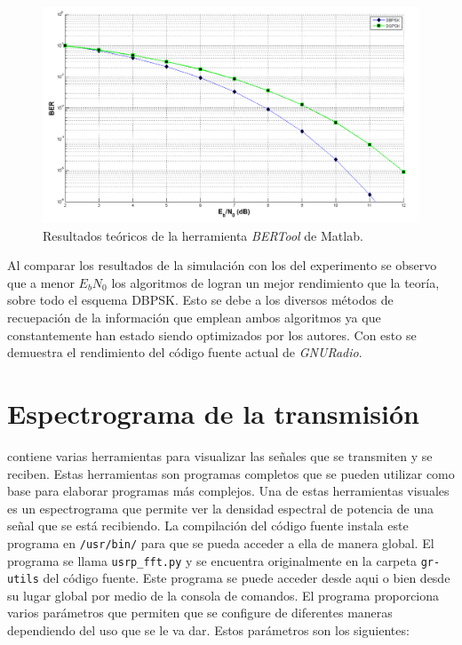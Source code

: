 \begin{figure}[htp]
  \centering
  \includegraphics[scale=0.455]{figs/berteor}
  \caption{Resultados te\'oricos de la herramienta \emph{BERTool} de Matlab.}
  \label{fig:berteor}
\end{figure}

Al comparar los resultados de la simulaci\'on con los del experimento se observo que a menor $E_bN_0$ los algoritmos de \gnuradio
logran un mejor rendimiento que la teor\'ia, sobre todo el esquema DBPSK. Esto se debe a los diversos m\'etodos de recuepaci\'on
de la informaci\'on que emplean ambos algoritmos ya que constantemente han estado siendo optimizados por los autores. Con esto se
demuestra el rendimiento del c\'odigo fuente actual de \emph{GNURadio}.


\section{Espectrograma de la transmisi\'on}

\gnuradio contiene varias herramientas para visualizar las se\~nales que se transmiten y se reciben.
Estas herramientas son programas completos que se pueden utilizar como base para elaborar programas
m\'as complejos. Una de estas herramientas visuales es un espectrograma que permite ver la densidad
espectral de potencia de una se\~nal que se est\'a recibiendo. La compilaci\'on del c\'odigo fuente
instala este programa en \verb|/usr/bin/| para que se pueda acceder a ella de manera global. El
programa se llama \verb|usrp_fft.py| y se encuentra originalmente en la carpeta \verb|gr-utils| del
c\'odigo fuente. Este programa se puede acceder desde aqui o bien desde su lugar global por medio de
la consola de comandos. El programa proporciona varios par\'ametros que permiten que se configure de
diferentes maneras dependiendo del uso que se le va dar. Estos par\'ametros son los siguientes:

